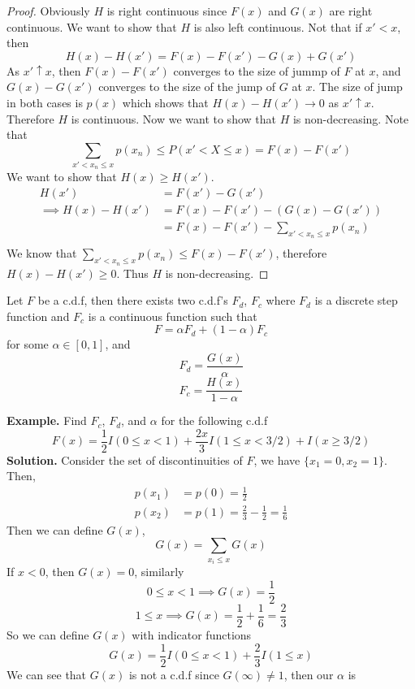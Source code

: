 \documentclass[openany]{report}
\begin{document}
\begin{proof}
    Obviously $H$ is right continuous since $F(x)$ and $G(x)$ are right continuous. We want to show that $H$ is also left continuous. Not that if $x' < x$, then 
    \[H(x) - H(x') = F(x) - F(x') - G(x) + G(x')\]
    As $x' \uparrow x$, then $F(x) - F(x')$ converges to the size of jummp of $F$ at $x$, and $G(x) - G(x')$ converges to the size of the jump of $G$ at $x$. The size of jump in both cases is $p(x)$ which shows that $H(x) - H(x') \rightarrow 0$ as $x'\uparrow x$. Therefore $H$ is continuous. Now we want to show that $H$ is non-decreasing. Note that
    \[\sum_{x' < x_n \leq x} p(x_n)\leq P(x' < X \leq x) = F(x) - F(x')\]
    We want to show that $H(x) \geq H(x')$.
    \begin{align*}
        H(x') &= F(x') - G(x')\\
        \implies H(x) - H(x') &= F(x) - F(x') - (G(x) - G(x'))\\
        &= F(x) - F(x') - \sum_{x' < x_n \leq x} p(x_n)\\ 
    \end{align*}    
    We know that $\sum\limits_{x' < x_n \leq x} p(x_n) \leq F(x) - F(x')$, therefore $H(x) - H(x') \geq 0$. Thus $H$ is non-decreasing. 
\end{proof}
\begin{theorem}
    Let $F$ be a c.d.f, then there exists two c.d.f's $F_d$, $F_c$ where $F_d$ is a discrete step function and $F_c$ is a continuous function such that
    \[F = \alpha F_d + (1- \alpha)F_c\]
    for some $\alpha \in [0,1]$, and 
    \[F_d = \frac{G(x)}{\alpha}\]
    \[F_c = \frac{H(x)}{1 - \alpha}\]
\end{theorem}
\noindent
\textbf{Example.} Find $F_c$, $F_d$, and $\alpha$ for the following c.d.f
\[F(x) = \frac{1}{2}I(0 \leq x < 1) + \frac{2x}{3}I(1 \leq x < 3/2) + I(x \geq 3/2)\]
\textbf{Solution.} Consider the set of discontinuities of $F$, we have $\{x_1 = 0, x_2 = 1\}$. Then,
\begin{align*}
    p(x_1) &= p(0) = \frac{1}{2}\\
    p(x_2) &= p(1) = \frac{2}{3} - \frac{1}{2} = \frac{1}{6}
\end{align*}
Then we can define $G(x)$, 
\[G(x) = \sum_{x_i \leq x} G(x)\]
If $x < 0$, then $G(x) = 0$, similarly 
\[0 \leq x < 1 \implies G(x) = \frac{1}{2}\]
\[1 \leq x \implies G(x) = \frac{1}{2} + \frac{1}{6} = \frac{2}{3}\]
So we can define $G(x)$ with indicator functions 
\[G(x) = \frac{1}{2}I(0 \leq x < 1) + \frac{2}{3}I(1 \leq x)\]
We can see that $G(x)$ is not a c.d.f since $G(\infty) \neq 1$, then our $\alpha$ is 
\end{document}
